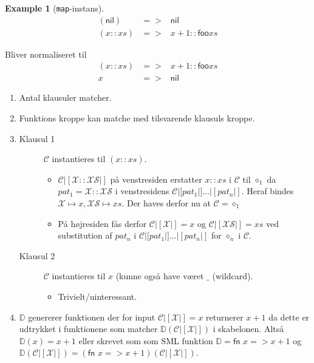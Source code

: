 \documentclass[oneside]{memoir}
\theoremstyle{definition}
\newtheorem{example}{Example}
\begin{document}
\begin{example}[\texttt{map}-instans]
  \begin{eqnarray*}
    (\mathsf{nil}) &=>& \mathsf{nil} \\
    (x::xs) &=>& x+1 :: \mathsf{foo} xs
  \end{eqnarray*}

  Bliver normaliseret til 
  \begin{eqnarray*}
    (x::xs) &=>& x+1 :: \mathsf{foo} xs \\
    x &=>& \mathsf{nil}
  \end{eqnarray*}

  \begin{enumerate}
  \item Antal klausuler matcher.

  \item Funktions kroppe kan matche med tilsvarende klausuls kroppe.

  
  \item 
    \begin{description}
    \item[Klausul 1] $\mathcal{C}$ instantieres til $(x::xs)$.
      \begin{itemize}
      \item $\mathcal{C}|[\mathcal{X}::\mathcal{X\!S}|]$ på venstresiden
        erstatter $x::xs$ i $\mathcal{C}$ til $\diamond_1$ da $pat_1 =
        \mathcal{X}::\mathcal{X\!S}$ i venstresidens
        $\mathcal{C}|[pat_1|]\ldots|[pat_n|]$. Heraf bindes $\mathcal{X} \mapsto
        x, \mathcal{X\!S} \mapsto xs$. Der haves derfor nu at $\mathcal{C} =
        \diamond_1$

      \item På højresiden fås derfor $\mathcal{C}|[\mathcal{X}|] = x$ og
        $\mathcal{C}|[\mathcal{X\!S}|] = xs$ ved substitution af $pat_n$ i
        $\mathcal{C}|[pat_1|]\ldots|[pat_n|]$ for $\diamond_n$ i $\mathcal{C}$.
      \end{itemize}
      

    \item[Klausul 2] $\mathcal{C}$ instantieres til $x$ (kunne også have været
      $\_$ (wildcard).
      \begin{itemize}
      \item Trivielt/uinteressant. 
      \end{itemize}

    \end{description}

  \item $\mathbb{D}$ genererer funktionen der for input
    $\mathcal{C}|[\mathcal{X}|] = x$ returnerer $x + 1$ da dette er udtrykket i
    funktionene som matcher $\mathbb{D}\left( \mathcal{C}|[\mathcal{X}|]
    \right)$ i skabelonen. Altså $\mathbb{D}(x) = x + 1$ eller skrevet som som
    SML funktion $\mathbb{D} = \textsf{fn } x => x + 1$ og $\mathbb{D}\left(
      \mathcal{C}|[\mathcal{X}|] \right) = \left( \textsf{fn } x => x + 1
    \right) \left( \mathcal{C}|[\mathcal{X}|] \right) $.
  \end{enumerate}


\end{example}
\end{document}
